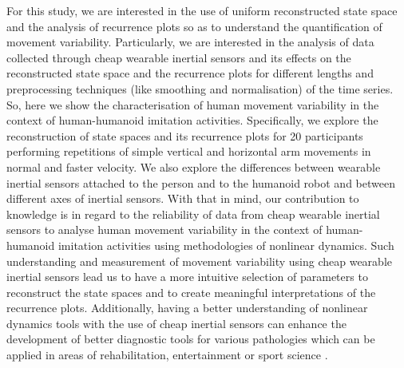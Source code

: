 \documentclass[10pt]{article}
\begin{document}
For this study, we are interested in the use of uniform reconstructed
state space and the analysis of recurrence plots so as to understand
the quantification of movement variability.
Particularly, we are interested in the analysis of data collected through
cheap wearable inertial sensors and its effects on the
reconstructed state space and the recurrence plots
for different lengths and preprocessing techniques
(like smoothing and normalisation) of the time series.
So, here we show the characterisation of human movement variability in the
context of human-humanoid imitation activities.
Specifically, we explore the reconstruction of state spaces and its recurrence plots for
20 participants performing repetitions of simple vertical and horizontal arm
movements in normal and faster velocity.
We also explore the differences between wearable inertial sensors attached
to the person and to the humanoid robot and between different axes of inertial sensors.
With that in mind, our contribution to knowledge is in regard to the
reliability of data from cheap wearable inertial sensors
to analyse human movement variability in the context of human-humanoid imitation activities
using methodologies of nonlinear dynamics.
Such understanding and measurement of movement variability using
cheap wearable inertial sensors lead us to have a more intuitive selection of parameters
to reconstruct the state spaces and to create meaningful interpretations
of the recurrence plots. Additionally, having a better understanding of
nonlinear dynamics tools with the use of cheap inertial sensors
can enhance the development of better diagnostic tools for various pathologies which
can be applied in areas of rehabilitation, entertainment or sport science \cite{tlockhart2013}.
\end{document}
